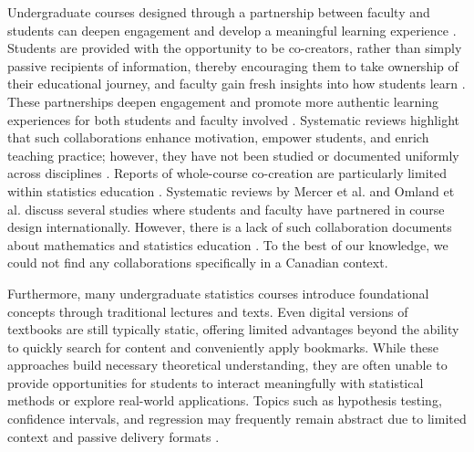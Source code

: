 \documentclass[11pt]{article}
\begin{document}
Undergraduate courses designed through a partnership between faculty and students can deepen engagement and develop a meaningful learning experience \cite{Healey2016, Bovill2019}. 
Students are provided with the opportunity to be co-creators, rather than simply passive recipients of information, thereby encouraging them to take ownership of their educational journey, and faculty gain fresh insights into how students learn \cite{Healey2016}.
These partnerships deepen engagement and promote more authentic learning experiences for both students and faculty involved \cite{Healey2016, Bengtson2013}.
Systematic reviews highlight that such collaborations enhance motivation, empower students, and enrich teaching practice; however, they have not been studied or documented uniformly across disciplines \cite{MercerMapstone2017, Bovill2019}. Reports of whole-course co-creation are particularly limited within statistics education \cite{Kim2022}. 
Systematic reviews by Mercer et al. \cite{MercerMapstone2017} and Omland et al. \cite{Omland2025} discuss several studies where students and faculty have partnered in course design internationally. However, there is a lack of such collaboration documents about mathematics and statistics education \cite{Duah2011}.
To the best of our knowledge, we could not find any collaborations specifically in a Canadian context.

Furthermore, many undergraduate statistics courses introduce foundational concepts through traditional lectures and texts. 
Even digital versions of textbooks are still typically static, offering limited advantages beyond the ability to quickly search for content and conveniently apply bookmarks.
While these approaches build necessary theoretical understanding, they are often unable to provide opportunities for students to interact meaningfully with statistical methods or explore real-world applications. 
Topics such as hypothesis testing, confidence intervals, and regression may frequently remain abstract due to limited context and passive delivery formats \cite{Tintle2015}.
\end{document}
